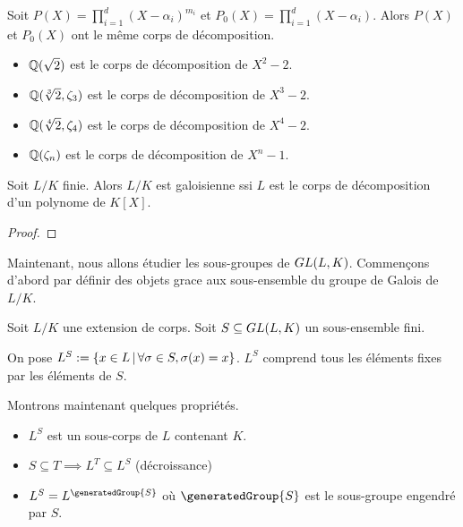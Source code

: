 \begin{remarque}
	Soit $P(X) = \displaystyle \prod_{i = 1}^{d} (X - \alpha_{i})^{m_{i}}$ et
	$P_{0}(X) = \displaystyle \prod_{i = 1}^{d} (X - \alpha_{i})$. Alors $P(X)$
	et $P_{0}(X)$ ont le même corps de décomposition.
\end{remarque}

\begin{exemple}
	\begin{itemize}
		\item $\mathbb{Q}(\sqrt{2})$ est le corps de décomposition de $X^{2} -
			2$.
		\item $\mathbb{Q}(\sqrt[3]{2}, \zeta_{3})$ est le corps de décomposition
			de $X^{3} - 2$.
		\item $\mathbb{Q}(\sqrt[4]{2}, \zeta_{4})$ est le corps de décomposition
			de $X^{4} - 2$.
		\item $\mathbb{Q}(\zeta_{n})$ est le corps de décomposition de $X^{n} -
			1$.
	\end{itemize}
\end{exemple}

\begin{proposition}
	Soit $L/K$ finie. Alors $L/K$ est galoisienne ssi $L$ est le corps de
	décomposition d'un polynome de $K[X]$.
\end{proposition}

\ifdefined\outputproof
\begin{proof}

\end{proof}
\fi

Maintenant, nous allons étudier les sous-groupes de $GL(L, K)$.
Commençons d'abord par définir des objets grace aux sous-ensemble du groupe de
Galois de $L/K$.

\begin{definition}
	Soit $L/K$ une extension de corps.
	Soit $S \subseteq GL(L, K)$ un sous-ensemble fini.

	On pose $L^{S} := \left\{x \in L \, | \, \forall \sigma \in S, \sigma(x) = x \right\}$.
	$L^{S}$ comprend tous les éléments fixes par les éléments de $S$.
\end{definition}

Montrons maintenant quelques propriétés.

\begin{proposition}
	\begin{itemize}
		\item $L^{S}$ est un sous-corps de $L$ contenant $K$.
		\item $S \subseteq T \implies L^{T} \subseteq L^{S}$ (décroissance)
		\item $L^{S} = L^{\generatedGroup{S}}$ où $\generatedGroup{S}$ est le
			sous-groupe engendré par $S$.
	\end{itemize}
\end{proposition}

